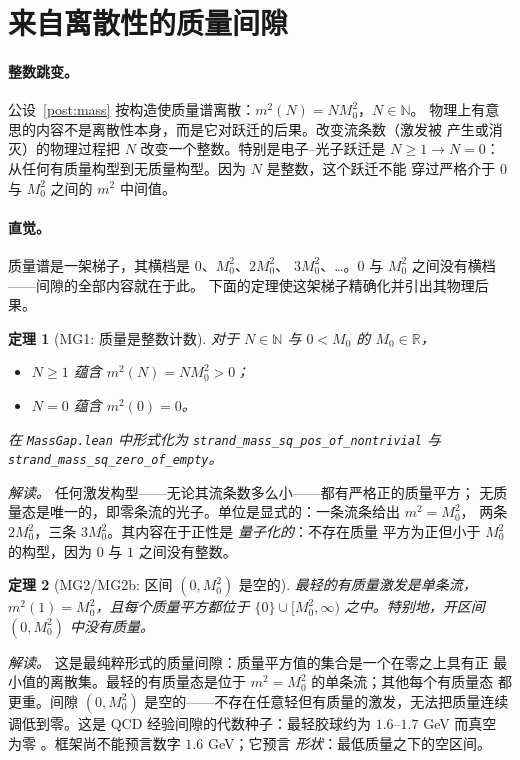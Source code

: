\documentclass[aps,prd,preprint,superscriptaddress,amsmath,amssymb]{revtex4-2}
\newtheorem{theorem}{定理}[section]
\begin{document}
\section{来自离散性的质量间隙}
\label{sec:massgap}

\paragraph{整数跳变。}
公设~\ref{post:mass} 按构造使质量谱离散：$m^2(N)=N M_0^2$，$N\in\mathbb{N}$。
物理上有意思的内容不是离散性本身，而是它对跃迁的后果。改变流条数（激发被
产生或消灭）的物理过程把 $N$ 改变一个整数。特别是电子--光子跃迁是
$N\ge1\to N=0$：从任何有质量构型到无质量构型。因为 $N$ 是整数，这个跃迁不能
穿过严格介于 $0$ 与 $M_0^2$ 之间的 $m^2$ 中间值。

\paragraph{直觉。} 质量谱是一架梯子，其横档是 $0$、$M_0^2$、$2M_0^2$、
$3M_0^2$、\ldots。$0$ 与 $M_0^2$ 之间没有横档——间隙的全部内容就在于此。
下面的定理使这架梯子精确化并引出其物理后果。

\begin{theorem}[MG1: 质量是整数计数]
\label{thm:mg1}
对于 $N\in\mathbb{N}$ 与 $0<M_0$ 的 $M_0\in\mathbb{R}$，
\begin{itemize}
\item $N\ge1$ 蕴含 $m^2(N)=N M_0^2>0$；
\item $N=0$ 蕴含 $m^2(0)=0$。
\end{itemize}
在 \texttt{MassGap.\allowbreak lean} 中形式化为 \texttt{strand\_mass\_sq\_\allowbreak pos\_of\_\allowbreak nontrivial}
与 \texttt{strand\_mass\_sq\_\allowbreak zero\_of\_\allowbreak empty}。
\end{theorem}

\emph{解读。} 任何激发构型——无论其流条数多么小——都有严格正的质量平方；
无质量态是唯一的，即零条流的光子。单位是显式的：一条流条给出 $m^2=M_0^2$，
两条 $2M_0^2$，三条 $3M_0^2$。其内容在于正性是 \emph{量子化的}：不存在质量
平方为正但小于 $M_0^2$ 的构型，因为 $0$ 与 $1$ 之间没有整数。

\begin{theorem}[MG2/MG2b: 区间 $(0,M_0^2)$ 是空的]
\label{thm:mg2}
最轻的有质量激发是单条流，$m^2(1)=M_0^2$，且每个质量平方都位于
$\{0\}\cup[M_0^2,\infty)$ 之中。特别地，开区间 $(0,M_0^2)$ 中没有质量。
\end{theorem}

\emph{解读。} 这是最纯粹形式的质量间隙：质量平方值的集合是一个在零之上具有正
最小值的离散集。最轻的有质量态是位于 $m^2=M_0^2$ 的单条流；其他每个有质量态
都更重。间隙 $(0,M_0^2)$ 是空的——不存在任意轻但有质量的激发，无法把质量连续
调低到零。这是 QCD 经验间隙的代数种子：最轻胶球约为 $1.6$--$1.7$ GeV 而真空
为零 \cite{morningstar1999glueball,chen2006glueball}。框架尚不能预言数字
$1.6$ GeV；它预言 \emph{形状}：最低质量之下的空区间。
\end{document}
